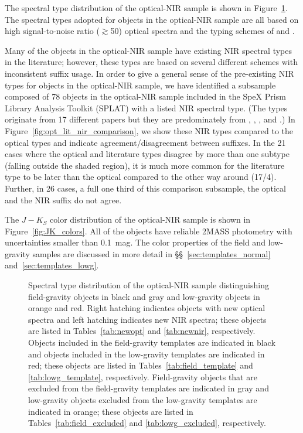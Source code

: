 \documentclass[modern,trackchanges]{aastex61}
\begin{document}
The spectral type distribution of the optical-NIR sample is shown in Figure~\ref{fig:spthist}.
The spectral types adopted for objects in the optical-NIR sample are all based on high signal-to-noise ratio ($\gtrsim$50) optical spectra and the typing schemes of \cite{K99} and \cite{Cruz09_lowg}.

Many of the objects in the optical-NIR sample have existing NIR spectral types in the literature; however, these types are based on several different schemes with inconsistent suffix usage.
In order to give a general sense of the pre-existing NIR types for objects in the optical-NIR sample, we have identified a subsample composed of 78 objects in the optical-NIR sample included in the SpeX Prism Library Analysis Toolkit (SPLAT) with a listed NIR spectral type.
(The types originate from 17 different papers but they are predominately from \citet{Knapp04}, \citet{Allers:2010cg}, \citet{Kirkpatrick10}, and \citet{Gagne:2015dc}.)
In Figure~\ref{fig:opt_lit_nir_comparison}, we show these NIR types compared to the optical types and indicate agreement/disagreement between suffixes.
In the 21 cases where the optical and literature types disagree by more than one subtype (falling outside the shaded region), it is much more common for the literature type to be later than the optical compared to the other way around (17/4).
Further, in 26 cases, a full one third of this comparison subsample, the optical and the NIR suffix do not agree.


The $J-K_S$ color distribution of the optical-NIR sample is shown in Figure~\ref{fig:JK_colors}.
All of the objects have reliable 2MASS photometry with uncertainties smaller than 0.1~mag.
The color properties of the field and low-gravity samples are discussed in more detail in \S\S~\ref{sec:templates_normal} and~\ref{sec:templates_lowg}.

\begin{figure}
    \caption{Spectral type distribution of the optical-NIR sample distinguishing field-gravity objects in black and gray and low-gravity objects in orange and red.
    Right hatching indicates objects with new optical spectra and left hatching indicates new NIR spectra; these objects are listed in Tables~\ref{tab:newopt} and \ref{tab:newnir}, respectively.
    Objects included in the field-gravity templates are indicated in black and objects included in the low-gravity templates are indicated in red; these objects are listed in Tables~\ref{tab:field_template} and \ref{tab:lowg_template}, respectively.
    Field-gravity objects that are excluded from the field-gravity templates are indicated in gray and low-gravity objects excluded from the low-gravity templates are indicated in orange; these objects are listed in Tables~\ref{tab:field_excluded} and \ref{tab:lowg_excluded}, respectively.}
  \label{fig:spthist}
\end{figure}
\end{document}
